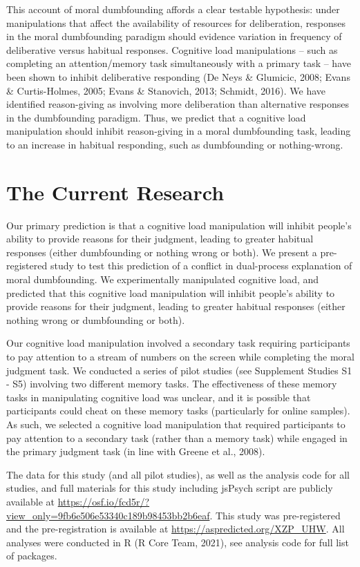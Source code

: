 \documentclass[
  american,
  man,floatsintext]{apa7}
\begin{document}
This account of moral dumbfounding affords a clear testable hypothesis: under manipulations that affect the availability of resources for deliberation, responses in the moral dumbfounding paradigm should evidence variation in frequency of deliberative versus habitual responses. Cognitive load manipulations -- such as completing an attention/memory task simultaneously with a primary task -- have been shown to inhibit deliberative responding (De Neys \& Glumicic, 2008; Evans \& Curtis-Holmes, 2005; Evans \& Stanovich, 2013; Schmidt, 2016). We have identified reason-giving as involving more deliberation than alternative responses in the dumbfounding paradigm. Thus, we predict that a cognitive load manipulation should inhibit reason-giving in a moral dumbfounding task, leading to an increase in habitual responding, such as dumbfounding or nothing-wrong.

\hypertarget{the-current-research}{%
\section{The Current Research}\label{the-current-research}}

Our primary prediction is that a cognitive load manipulation will inhibit people's ability to provide reasons for their judgment, leading to greater habitual responses (either dumbfounding or nothing wrong or both). We present a pre-registered study to test this prediction of a conflict in dual-process explanation of moral dumbfounding. We experimentally manipulated cognitive load, and predicted that this cognitive load manipulation will inhibit people's ability to provide reasons for their judgment, leading to greater habitual responses (either nothing wrong or dumbfounding or both).

Our cognitive load manipulation involved a secondary task requiring participants to pay attention to a stream of numbers on the screen while completing the moral judgment task. We conducted a series of pilot studies (see Supplement Studies S1 - S5) involving two different memory tasks. The effectiveness of these memory tasks in manipulating cognitive load was unclear, and it is possible that participants could cheat on these memory tasks (particularly for online samples). As such, we selected a cognitive load manipulation that required participants to pay attention to a secondary task (rather than a memory task) while engaged in the primary judgment task (in line with Greene et al., 2008).

The data for this study (and all pilot studies), as well as the analysis code for all studies, and full materials for this study including jsPsych script are publicly available at \color{blue}\url{https://osf.io/fcd5r/?view_only=9fb6e506e53340c189b98453bb2b6eaf}\color{black}. This study was pre-registered and the pre-registration is available at \color{blue}\url{https://aspredicted.org/XZP_UHW}\color{black}. All analyses were conducted in R (R Core Team, 2021), see analysis code for full list of packages.
\end{document}
